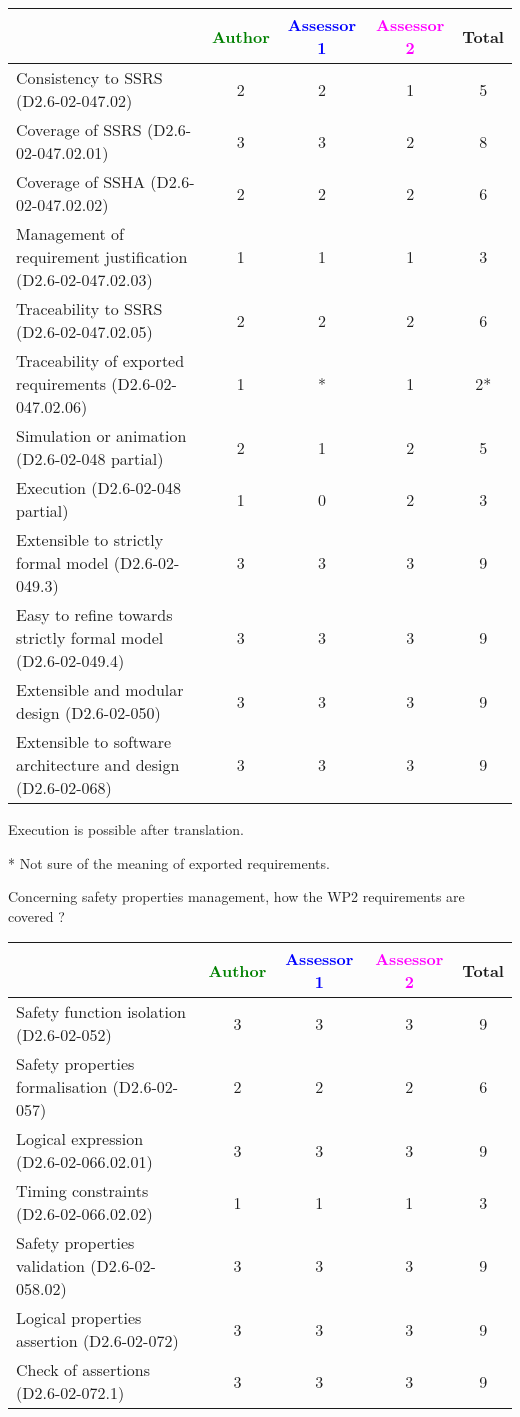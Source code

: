 \begin{tabular}{|l | c | c | c | c|}
\hline
& \textcolor{green}{Author} & \textcolor{blue}{Assessor 1} & \textcolor{magenta}{Assessor 2} & Total \\
\hline 
Consistency to SSRS (D2.6-02-047.02) & 2 & 2 & 1 & 5 \\
\hline
Coverage of SSRS (D2.6-02-047.02.01)  & 3 & 3 & 2 & 8 \\
\hline
Coverage of SSHA (D2.6-02-047.02.02)  & 2 & 2 & 2 & 6 \\
\hline
Management of requirement justification (D2.6-02-047.02.03)  & 1 & 1 & 1 & 3 \\
\hline
Traceability to  SSRS (D2.6-02-047.02.05)  & 2 & 2 & 2 & 6 \\
\hline
Traceability of exported requirements (D2.6-02-047.02.06)  & 1 & * & 1 & 2* \\
\hline
Simulation or animation (D2.6-02-048 partial)  & 2 & 1 & 2 &  5 \\
\hline
Execution (D2.6-02-048 partial)  & 1 & 0 & 2 & 3 \\
\hline
Extensible to strictly formal model (D2.6-02-049.3) & 3 & 3 & 3 & 9  \\
\hline
Easy to  refine towards strictly formal model (D2.6-02-049.4) & 3 & 3 & 3 & 9  \\
\hline
Extensible and modular design (D2.6-02-050)  & 3 & 3 & 3 & 9 \\
\hline
Extensible to software architecture and design (D2.6-02-068)   & 3 & 3 & 3 & 9 \\
\hline
\end{tabular}


\begin{author_comment}
Execution is possible after translation.
\end{author_comment}
\begin{assessor1}
* Not sure of the meaning of exported requirements.
\end{assessor1}

Concerning safety properties management, how the WP2 requirements are covered ?

\begin{tabular}{|l | c | c | c | c|}
\hline
& \textcolor{green}{Author} & \textcolor{blue}{Assessor 1} & \textcolor{magenta}{Assessor 2} & Total \\
\hline 
Safety function isolation (D2.6-02-052)  & 3 & 3 & 3 & 9 \\
\hline 
Safety properties formalisation (D2.6-02-057)  & 2 & 2 & 2 & 6 \\
\hline
Logical expression (D2.6-02-066.02.01)  & 3 & 3 & 3 & 9 \\
\hline
Timing constraints (D2.6-02-066.02.02)  & 1 & 1 & 1 & 3 \\
\hline
Safety properties validation (D2.6-02-058.02)  & 3 & 3 & 3 & 9 \\
\hline
Logical properties assertion (D2.6-02-072)  &  3 & 3 & 3 & 9 \\
\hline
Check  of assertions (D2.6-02-072.1)  & 3 & 3 & 3 & 9 \\
\hline
\end{tabular}


